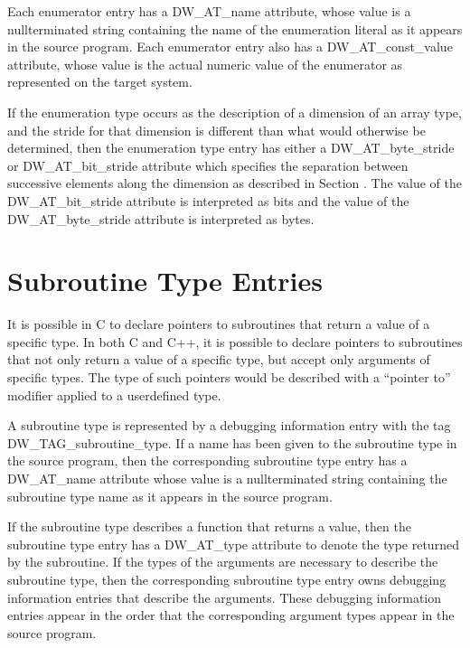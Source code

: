 Each enumerator entry has a DW\_AT\_name attribute, whose
value is a null\dash terminated string containing the name of the
enumeration literal as it appears in the source program. Each
enumerator entry also has a DW\_AT\_const\_value attribute,
whose value is the actual numeric value of the enumerator as
represented on the target system.


If the enumeration type occurs as the description of a
dimension of an array type, and the stride for that dimension
is different than what would otherwise be determined, then
the enumeration type entry has either a DW\_AT\_byte\_stride
or DW\_AT\_bit\_stride attribute which specifies the separation
between successive elements along the dimension as described
in 
Section . 
The value of the DW\_AT\_bit\_stride attribute
is interpreted as bits and the value of the DW\_AT\_byte\_stride
attribute is interpreted as bytes.


\section{Subroutine Type Entries}
\label{chap:subroutinetypeentries}

It is possible in C to declare pointers to subroutines
that return a value of a specific type. In both C and C++,
it is possible to declare pointers to subroutines that not
only return a value of a specific type, but accept only
arguments of specific types. The type of such pointers would
be described with a ``pointer to'' modifier applied to a
user\dash defined type.

A subroutine type is represented by a debugging information
entry with the tag DW\_TAG\_subroutine\_type. If a name has
been given to the subroutine type in the source program,
then the corresponding subroutine type entry has a DW\_AT\_name
attribute whose value is a null\dash terminated string containing
the subroutine type name as it appears in the source program.

If the subroutine type describes a function that returns
a value, then the subroutine type entry has a DW\_AT\_type
attribute to denote the type returned by the subroutine. If
the types of the arguments are necessary to describe the
subroutine type, then the corresponding subroutine type
entry owns debugging information entries that describe the
arguments. These debugging information entries appear in the
order that the corresponding argument types appear in the
source program.

